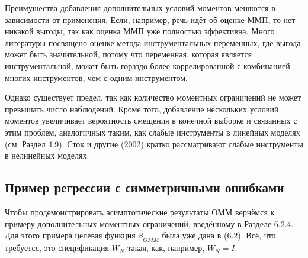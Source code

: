 Преимущества добавления дополнительных условий моментов меняются в зависимости от применения. Если, например, речь идёт об оценке ММП, то нет никакой выгоды, так как оценка ММП уже полностью эффективна. Много литературы посвящено оценке метода инструментальных переменных, где выгода может быть значительной, потому что переменная, которая является инструментальной, может быть гораздо более коррелированной с комбинацией многих инструментов, чем с одним инструментом.

Однако существует предел, так как количество моментных ограничений не может превышать число наблюдений. Кроме того, добавление нескольких условий моментов увеличивает вероятность смещения в конечной выборке и связанных с этим проблем, аналогичных таким, как слабые инструменты в линейных моделях (см. Раздел 4.9). Сток и другие (2002) кратко рассматривают слабые инструменты в нелинейных моделях.

\subsection{Пример регрессии с симметричными ошибками}

Чтобы продемонстрировать асимптотические результаты ОММ вернёмся к примеру дополнительных моментных ограничений, введённому в Разделе 6.2.4. Для этого примера целевая функция $\hat{\beta}_{GMM}$ была уже дана в (6.2). Всё, что требуется, это спецификация $W_N$ такая, как, например, $W_N=I$.

